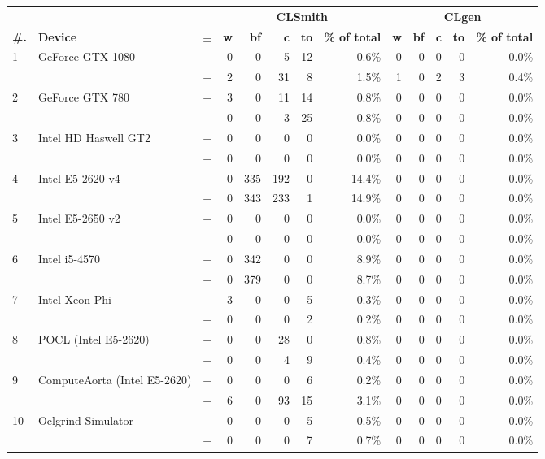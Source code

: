   \begin{tabular}{lll | rrrrr | rrrrr }
  \toprule
  & & & \multicolumn{5}{c|}{\textbf{CLSmith}} & \multicolumn{5}{c}{\textbf{CLgen}} \\
  \textbf{\#.} & \textbf{Device} & $\pm$ &
  \textbf{w} & \textbf{bf} & \textbf{c} & \textbf{to} & \textbf{\% of total} &
  \textbf{w} & \textbf{bf} & \textbf{c} & \textbf{to} & \textbf{\% of total} \\
  \midrule
  \multirow{ 2}{*}{1} & \multirow{ 2}{*}{GeForce GTX 1080} & $-$ & 0 & 0 & 5 & 12 & 0.6\%       & 0 & 0 & 0 & 0 & 0.0\% \\& & $+$ & 2 & 0 & 31 & 8 & 1.5\% & 1 & 0 & 2 & 3 & 0.4\% \\
\hline
\multirow{ 2}{*}{2} & \multirow{ 2}{*}{GeForce GTX 780} & $-$ & 3 & 0 & 11 & 14 & 0.8\%       & 0 & 0 & 0 & 0 & 0.0\% \\& & $+$ & 0 & 0 & 3 & 25 & 0.8\% & 0 & 0 & 0 & 0 & 0.0\% \\
\hline
\multirow{ 2}{*}{3} & \multirow{ 2}{*}{Intel HD Haswell GT2} & $-$ & 0 & 0 & 0 & 0 & 0.0\%       & 0 & 0 & 0 & 0 & 0.0\% \\& & $+$ & 0 & 0 & 0 & 0 & 0.0\% & 0 & 0 & 0 & 0 & 0.0\% \\
\hline
\multirow{ 2}{*}{4} & \multirow{ 2}{*}{Intel E5-2620 v4} & $-$ & 0 & 335 & 192 & 0 & 14.4\%       & 0 & 0 & 0 & 0 & 0.0\% \\& & $+$ & 0 & 343 & 233 & 1 & 14.9\% & 0 & 0 & 0 & 0 & 0.0\% \\
\hline
\multirow{ 2}{*}{5} & \multirow{ 2}{*}{Intel E5-2650 v2} & $-$ & 0 & 0 & 0 & 0 & 0.0\%       & 0 & 0 & 0 & 0 & 0.0\% \\& & $+$ & 0 & 0 & 0 & 0 & 0.0\% & 0 & 0 & 0 & 0 & 0.0\% \\
\hline
\multirow{ 2}{*}{6} & \multirow{ 2}{*}{Intel i5-4570} & $-$ & 0 & 342 & 0 & 0 & 8.9\%       & 0 & 0 & 0 & 0 & 0.0\% \\& & $+$ & 0 & 379 & 0 & 0 & 8.7\% & 0 & 0 & 0 & 0 & 0.0\% \\
\hline
\multirow{ 2}{*}{7} & \multirow{ 2}{*}{Intel Xeon Phi} & $-$ & 3 & 0 & 0 & 5 & 0.3\%       & 0 & 0 & 0 & 0 & 0.0\% \\& & $+$ & 0 & 0 & 0 & 2 & 0.2\% & 0 & 0 & 0 & 0 & 0.0\% \\
\hline
\multirow{ 2}{*}{8} & \multirow{ 2}{*}{POCL (Intel E5-2620)} & $-$ & 0 & 0 & 28 & 0 & 0.8\%       & 0 & 0 & 0 & 0 & 0.0\% \\& & $+$ & 0 & 0 & 4 & 9 & 0.4\% & 0 & 0 & 0 & 0 & 0.0\% \\
\hline
\multirow{ 2}{*}{9} & \multirow{ 2}{*}{ComputeAorta (Intel E5-2620)} & $-$ & 0 & 0 & 0 & 6 & 0.2\%       & 0 & 0 & 0 & 0 & 0.0\% \\& & $+$ & 6 & 0 & 93 & 15 & 3.1\% & 0 & 0 & 0 & 0 & 0.0\% \\
\hline
\multirow{ 2}{*}{10} & \multirow{ 2}{*}{Oclgrind Simulator} & $-$ & 0 & 0 & 0 & 5 & 0.5\%       & 0 & 0 & 0 & 0 & 0.0\% \\& & $+$ & 0 & 0 & 0 & 7 & 0.7\% & 0 & 0 & 0 & 0 & 0.0\% \\
  \bottomrule
\end{tabular}

